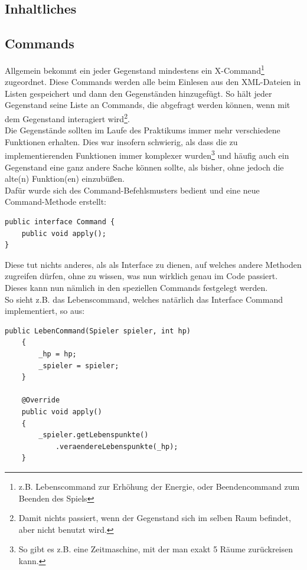 \documentclass[12pt,twoside]{article}
\theoremstyle{plain}
\theoremstyle{definition}
\theoremstyle{remark}
\begin{document}
\subsection{Inhaltliches}
\label{ssec:main_cont}

\subsection{Commands}
\label{ssec:main_commands}
Allgemein bekommt ein jeder Gegenstand mindestens ein X-Command\footnote{z.B. Lebenscommand zur Erhöhung der Energie, oder Beendencommand zum Beenden des Spiels} zugeordnet.
Diese Commands werden alle beim Einlesen aus den XML-Dateien in Listen gespeichert und dann den Gegenständen hinzugefügt.
So hält jeder Gegenstand seine Liste an Commands, die abgefragt werden können, wenn mit dem Gegenstand interagiert wird\footnote{Damit nichts passiert, wenn der Gegenstand sich im selben Raum befindet, aber nicht benutzt wird.}.\\
Die Gegenstände sollten im Laufe des Praktikums immer mehr verschiedene Funktionen erhalten.
Dies war insofern schwierig, als dass die zu implementierenden Funktionen immer komplexer wurden\footnote{So gibt es z.B. eine Zeitmaschine, mit der man exakt 5 Räume zurückreisen kann.} und häufig auch ein Gegenstand eine ganz andere Sache können sollte, als bisher, ohne jedoch die alte(n) Funktion(en) einzubüßen.\\
Dafür wurde sich des Command-Befehlsmusters bedient und eine neue Command-Methode erstellt:
\begin{lstlisting}[caption=Unser Command-Interface, label=code:main_command]
public interface Command {
	public void apply();
}
\end{lstlisting}
Diese tut nichts anderes, als als Interface zu dienen, auf welches andere Methoden zugreifen dürfen, ohne zu wissen, was nun wirklich genau im Code passiert.
Dieses kann nun nämlich in den speziellen Commands festgelegt werden.
\\
So sieht z.B. das Lebenscommand, welches natärlich das Interface Command implementiert, so aus:
\begin{lstlisting}[caption=LebenCommand - eine implementation des Command-Interfaces, label=code:main_lebencommand]
public LebenCommand(Spieler spieler, int hp)
    {
        _hp = hp;
        _spieler = spieler;
    }

    @Override
    public void apply()
    {
        _spieler.getLebenspunkte()
            .veraendereLebenspunkte(_hp);
    }
\end{lstlisting}
\end{document}
